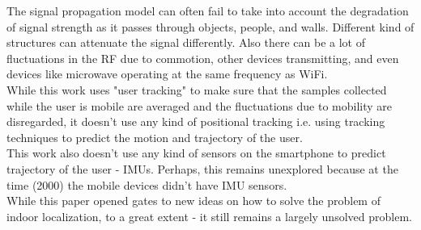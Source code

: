 \documentclass[a4paper]{article}
\begin{document}
The signal propagation model can often fail to take into account the degradation of signal strength as it passes through objects, people, and walls. Different kind of structures can attenuate the signal differently. Also there can be a lot of fluctuations in the RF due to commotion, other devices transmitting, and even devices like microwave operating at the same frequency as WiFi.\\

While this work uses "user tracking" to make sure that the samples collected while the user is mobile are averaged and the fluctuations due to mobility are disregarded, it doesn't use any kind of positional tracking i.e. using tracking techniques to predict the motion and trajectory of the user.\\

This work also doesn't use any kind of sensors on the smartphone to predict trajectory of the user - IMUs. Perhaps, this remains unexplored because at the time (2000) the mobile devices didn't have IMU sensors.\\ 

While this paper opened gates to new ideas on how to solve the problem of indoor localization, to a great extent - it still remains a largely unsolved problem.\\ 






 
\end{document}
